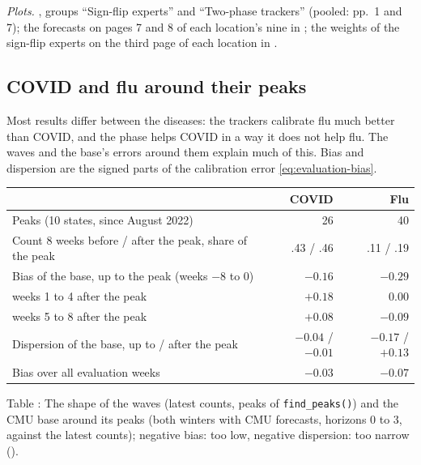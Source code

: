 \documentclass[11pt,a4paper]{article}
\theoremstyle{definition}
\theoremstyle{remark}
\begin{document}
\emph{Plots.} , groups ``Sign-flip
experts'' and ``Two-phase trackers'' (pooled: pp.~1 and 7); the forecasts
on pages 7 and 8 of each location's nine in
; the weights of the sign-flip experts on
the third page of each location in .

\subsection{COVID and flu around their peaks}
\label{sec:results-flu-covid}
Most results differ between the diseases: the trackers calibrate flu much
better than COVID, and the phase helps COVID in a way it does not help
flu. The waves and the base's errors around them explain much of this.
Bias and dispersion are the signed parts of the calibration error
\eqref{eq:evaluation-bias}.

\begin{center}\small
\renewcommand{\arraystretch}{1.12}
\begin{tabular}{@{}lrr@{}}
\toprule
 & COVID & Flu\\
\midrule
Peaks (10 states, since August 2022) & 26 & 40\\
Count 8 weeks before / after the peak, share of the peak & .43 / .46 & .11 / .19\\
\addlinespace
Bias of the base, up to the peak (weeks $-8$ to 0) & $-0.16$ & $-0.29$\\
\quad weeks 1 to 4 after the peak & $+0.18$ & $0.00$\\
\quad weeks 5 to 8 after the peak & $+0.08$ & $-0.09$\\
Dispersion of the base, up to / after the peak & $-0.04$ / $-0.01$ & $-0.17$ / $+0.13$\\
Bias over all evaluation weeks & $-0.03$ & $-0.07$\\
\bottomrule
\end{tabular}
\end{center}
\label{tab:flu-covid}
\begin{center}\small Table \thetable: The shape of the waves (latest counts,
peaks of \texttt{find\_peaks()}) and the CMU base around its peaks (both
winters with CMU forecasts, horizons $0$ to $3$, against the latest
counts); negative bias: too low, negative dispersion: too narrow
().
\end{center}
\end{document}
